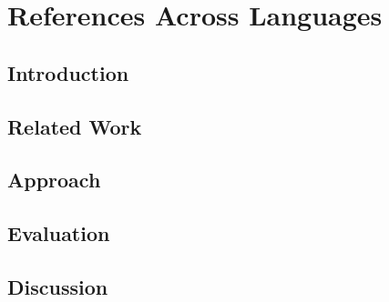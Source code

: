 \chapter{References Across Languages}

\section{Introduction}
\Blindtext[1]

\section{Related Work}
\Blindtext[1]

\section{Approach}
\Blindtext[1]

\section{Evaluation}
\Blindtext[1]

\section{Discussion}
\Blindtext[1]
